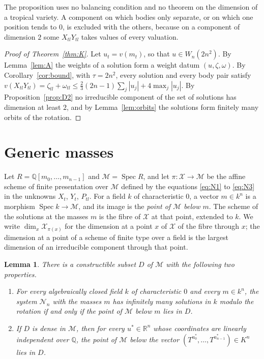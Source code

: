\documentclass[11pt]{amsart}
\newtheorem{lemma}[theorem]{Lemma}
\theoremstyle{definition}
\theoremstyle{remark}
\numberwithin{equation}{section}
\newcommand{\QQ}{\mathbb{Q}}
\newcommand{\RR}{\mathbb{R}}
\newcommand{\cN}{\mathcal{N}}
\newcommand{\cX}{\mathcal{X}}
\newcommand{\cM}{\mathcal{M}}
\DeclareMathOperator{\Spec}{Spec}
\begin{document}
The proposition uses no balancing condition and no theorem on the dimension of a tropical variety. A
component on which bodies only separate, or on which one position tends to $0$, is excluded with the
others, because on a component of dimension $2$ some $X_{tl} Y_{tl}$ takes values of every valuation.

\begin{proof}[Proof of Theorem~\ref{thm:K}]
Let $u_t = v(m_t)$, so that $u \in W_n(2n^2)$. By Lemma~\ref{lem:A} the weights of a solution form a
weight datum $(u, \zeta, \omega)$. By Corollary~\ref{cor:bound}, with $\tau = 2n^2$, every solution and
every body pair satisfy
$v(X_{tl} Y_{tl}) = \zeta_{tl} + \omega_{tl} \le \tfrac23 (2n - 1) \sum_j |u_j| + 4 \max_j |u_j|$. By
Proposition~\ref{prop:D2} no irreducible component of the set of solutions has dimension at least $2$,
and by Lemma~\ref{lem:orbits} the solutions form finitely many orbits of the rotation.
\end{proof}

\section{Generic masses}\label{sec:generic}

Let $R = \QQ[m_0, \dots, m_{n-1}]$ and $\cM = \Spec R$, and let $\pi \colon \cX \to \cM$ be the affine
scheme of finite presentation over $\cM$ defined by the equations \eqref{eq:N1} to \eqref{eq:N3} in the
unknowns $X_t$, $Y_t$, $P_{tl}$. For a field $k$ of characteristic $0$, a vector $m \in k^n$ is a
morphism $\Spec k \to \cM$, and its image is the \emph{point of $\cM$ below $m$}. The scheme of the
solutions at the masses $m$ is the fibre of $\cX$ at that point, extended to $k$. We write
$\dim_x \cX_{\pi(x)}$ for the dimension at a point $x$ of $\cX$ of the fibre through $x$; the dimension
at a point of a scheme of finite type over a field is the largest dimension of an irreducible component
through that point.

\begin{lemma}\label{lem:D0}
There is a constructible subset $D$ of $\cM$ with the following two properties.
\begin{enumerate}
\item[(a)] For every algebraically closed field $k$ of characteristic $0$ and every $m \in k^n$, the
system $\cN_n$ with the masses $m$ has infinitely many solutions in $k$ modulo the rotation if and only
if the point of $\cM$ below $m$ lies in $D$.
\item[(b)] If $D$ is dense in $\cM$, then for every $u^{*} \in \RR^n$ whose coordinates are linearly
independent over $\QQ$, the point of $\cM$ below the vector
$(T^{u^{*}_0}, \dots, T^{u^{*}_{n-1}}) \in K^n$ lies in $D$.
\end{enumerate}
\end{lemma}
\end{document}
